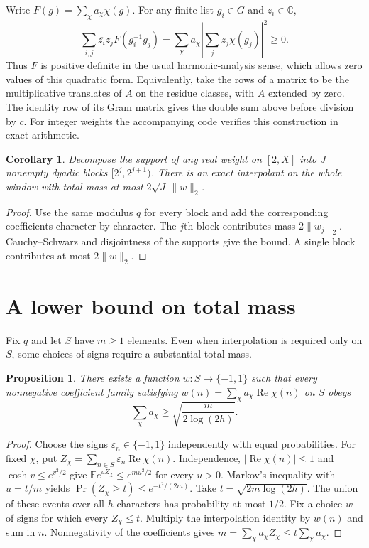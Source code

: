 \documentclass[11pt,a4paper]{article}
\newtheorem{proposition}[theorem]{Proposition}
\newtheorem*{corollary}{Corollary}
\newcommand{\C}{\mathbb{C}}
\newcommand{\RePart}{\operatorname{Re}}
\begin{document}
Write $F(g)=\sum_\chi a_\chi\chi(g)$. For any finite list $g_i\in G$ and $z_i\in\C$,
\[
  \sum_{i,j}\overline{z_i}z_j F(g_i^{-1}g_j)
   =\sum_\chi a_\chi\left|\sum_j z_j\chi(g_j)\right|^2\ge0.
\]
Thus $F$ is positive definite in the usual harmonic-analysis sense, which allows zero values of this quadratic form. Equivalently, take the rows of a matrix to be the multiplicative translates of $A$ on the residue classes, with $A$ extended by zero. The identity row of its Gram matrix gives the double sum above before division by $c$. For integer weights the accompanying code verifies this construction in exact arithmetic.

\begin{corollary}
Decompose the support of any real weight on $[2,X]$ into $J$ nonempty dyadic blocks $[2^j,2^{j+1})$. There is an exact interpolant on the whole window with total mass at most $2\sqrt J\,\|w\|_2$.
\end{corollary}
\begin{proof}
Use the same modulus $q$ for every block and add the corresponding coefficients character by character. The $j$th block contributes mass $2\|w_j\|_2$. Cauchy--Schwarz and disjointness of the supports give the bound. A single block contributes at most $2\|w\|_2$.
\end{proof}

\section{A lower bound on total mass}
Fix $q$ and let $S$ have $m\ge1$ elements. Even when interpolation is required only on $S$, some choices of signs require a substantial total mass.
\begin{proposition}\label{prop:lower}
There exists a function $w\colon S\to\{-1,1\}$ such that every nonnegative coefficient family satisfying $w(n)=\sum_\chi a_\chi\RePart\chi(n)$ on $S$ obeys
\[
  \sum_\chi a_\chi\ge\sqrt{\frac{m}{2\log(2h)}}.
\]
\end{proposition}
\begin{proof}
Choose the signs $\varepsilon_n\in\{-1,1\}$ independently with equal probabilities. For fixed $\chi$, put $Z_\chi=\sum_{n\in S}\varepsilon_n\RePart\chi(n)$. Independence, $|\RePart\chi(n)|\le1$ and $\cosh v\le e^{v^2/2}$ give $\mathbb E e^{uZ_\chi}\le e^{mu^2/2}$ for every $u>0$. Markov's inequality with $u=t/m$ yields $\Pr(Z_\chi\ge t)\le e^{-t^2/(2m)}$. Take $t=\sqrt{2m\log(2h)}$. The union of these events over all $h$ characters has probability at most $1/2$. Fix a choice $w$ of signs for which every $Z_\chi\le t$. Multiply the interpolation identity by $w(n)$ and sum in $n$. Nonnegativity of the coefficients gives $m=\sum_\chi a_\chi Z_\chi\le t\sum_\chi a_\chi$.
\end{proof}
\end{document}

